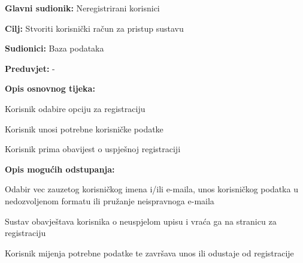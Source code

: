 			
			\noindent {}
			\begin{packed_item}
				
				\item \textbf{Glavni sudionik:} Neregistrirani korisnici
				\item  \textbf{Cilj:} Stvoriti korisnički račun za pristup sustavu
				\item  \textbf{Sudionici:} Baza podataka
				\item  \textbf{Preduvjet:} -
				\item  \textbf{Opis osnovnog tijeka:}
				
				\item[] \begin{packed_enum}
					
					\item Korisnik odabire opciju za registraciju
					\item Korisnik unosi potrebne korisničke podatke 
					\item Korisnik prima obavijest o uspješnoj registraciji
					
				\end{packed_enum}
				
				\item  \textbf{Opis mogućih odstupanja:}
				
				\item[] \begin{packed_item}
					
					\item[3.a] Odabir vec zauzetog korisničkog imena i/ili e-maila, unos korisničkog podatka u nedozvoljenom formatu ili pružanje neispravnoga e-maila 
					\item[] \begin{packed_enum}
						
						\item Sustav obavještava korisnika o neuspjelom upisu i vraća ga na stranicu za registraciju
						\item Korisnik mijenja potrebne podatke te završava unos ili odustaje od registracije
					\end{packed_enum}
					
				\end{packed_item}
			\end{packed_item}
			
